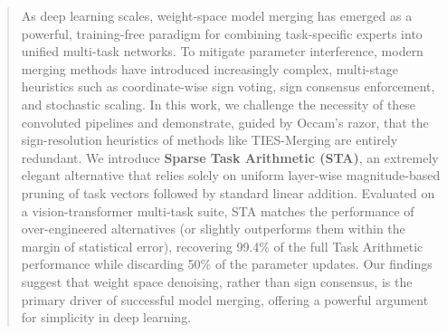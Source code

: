 \begin{abstract}
As deep learning scales, weight-space model merging has emerged as a powerful, training-free paradigm for combining task-specific experts into unified multi-task networks. To mitigate parameter interference, modern merging methods have introduced increasingly complex, multi-stage heuristics such as coordinate-wise sign voting, sign consensus enforcement, and stochastic scaling. In this work, we challenge the necessity of these convoluted pipelines and demonstrate, guided by Occam's razor, that the sign-resolution heuristics of methods like TIES-Merging are entirely redundant. We introduce \textbf{Sparse Task Arithmetic (STA)}, an extremely elegant alternative that relies solely on uniform layer-wise magnitude-based pruning of task vectors followed by standard linear addition. Evaluated on a vision-transformer multi-task suite, STA matches the performance of over-engineered alternatives (or slightly outperforms them within the margin of statistical error), recovering 99.4\% of the full Task Arithmetic performance while discarding 50\% of the parameter updates. Our findings suggest that weight space denoising, rather than sign consensus, is the primary driver of successful model merging, offering a powerful argument for simplicity in deep learning.
\end{abstract}
